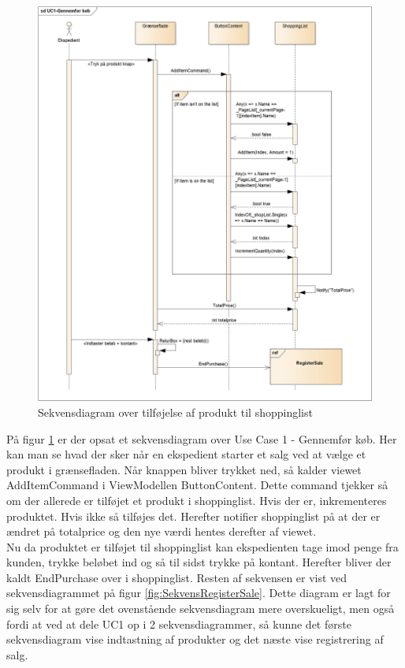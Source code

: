 \begin{figure}[H]
	\centering
	\includegraphics[width=1\textwidth]{Systemdesign/Frontend/GUI/Pics/Sekvensdiagram-TilfoejProdukt2}
	\caption{Sekvensdiagram over tilføjelse af produkt til shoppinglist}
	\label{fig:SekvensUC1}
\end{figure}

På figur \ref{fig:SekvensUC1} er der opsat et sekvensdiagram over Use Case 1 - Gennemfør køb. Her kan man se hvad der sker når en ekspedient starter et salg ved at vælge et produkt i grænsefladen. Når knappen bliver trykket ned, så kalder viewet AddItemCommand i ViewModellen ButtonContent. Dette command tjekker så om der allerede er tilføjet et produkt i shoppinglist. Hvis der er, inkrementeres produktet. Hvis ikke så tilføjes det. Herefter notifier shoppinglist på at der er ændret på totalprice og den nye værdi hentes derefter af viewet. \\
Nu da produktet er tilføjet til shoppinglist kan ekspedienten tage imod penge fra kunden, trykke beløbet ind og så til sidst trykke på kontant. Herefter bliver der kaldt EndPurchase over i shoppinglist. Resten af sekvensen er vist ved sekvensdiagrammet på figur \ref{fig:SekvensRegisterSale}. Dette diagram er lagt for sig selv for at gøre det ovenstående sekvensdiagram mere overskueligt, men også fordi at ved at dele UC1 op i 2 sekvensdiagrammer, så kunne det første sekvensdiagram vise indtastning af produkter og det næste vise registrering af salg.

